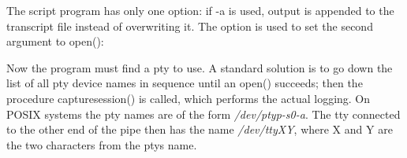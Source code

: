 The \textsf{script} program has only one option: if \textsf{{}-a} is
used, output is appended to the transcript file instead of overwriting
it. The option is used to set the second argument to \textsf{open()}: 


Now the program must find a pty to use. A standard solution is to go
down the list of all pty device names in sequence until an
\textsf{open()} succeeds; then the procedure \textsf{capturesession()}
is called, which performs the actual logging. On POSIX systems the pty
names are of the form \textsf{\textit{/dev/ptyp-s0-a}}. The tty
connected to the other end of the pipe then has the name
\textsf{\textit{/dev/ttyXY}}, where \textsf{X} and \textsf{Y} are the
two characters from the pty{\textquotesingle}s name.



